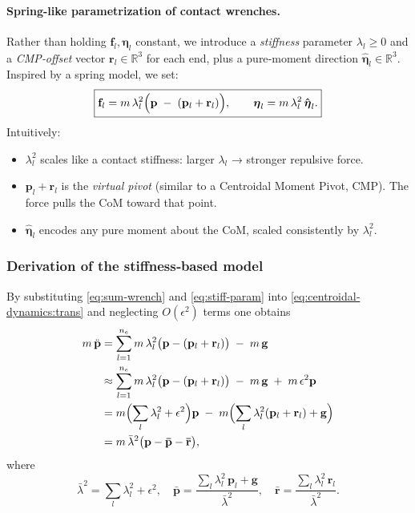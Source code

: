 \documentclass[main.tex]{subfiles}
\begin{document}
\begin{sloppypar}
\medskip
\paragraph{Spring-like parametrization of contact wrenches.}
Rather than holding $\mathbf{f}_l,\boldsymbol{\eta}_l$ constant, we introduce a \emph{stiffness} parameter $\lambda_l\ge0$ and a \emph{CMP‐offset} vector $\mathbf{r}_l\in\mathbb{R}^3$ for each end, plus a pure‐moment direction $\mathbf{\hat{\boldsymbol{\eta}}}_l\in\mathbb{R}^3$.  Inspired by a spring model, we set:
\begin{equation}\label{eq:stiff‐param}
\boxed{
\displaystyle
\mathbf{f}_l = m\,\lambda_l^2\Bigl(\mathbf{p} \;-\;(\mathbf{p}_l + \mathbf{r}_l)\Bigr),
\qquad
\boldsymbol{\eta}_l = m\,\lambda_l^2\,\mathbf{\hat{\boldsymbol{\eta}}}_l.
}
\end{equation}
Intuitively:
\begin{itemize}
  \item $\lambda_l^2$ scales like a contact stiffness: larger $\lambda_l$ → stronger repulsive force.
  \item $\mathbf{p}_l + \mathbf{r}_l$ is the \emph{virtual pivot} (similar to a Centroidal Moment Pivot, CMP).  The force pulls the CoM toward that point.
  \item $\mathbf{\hat{\boldsymbol{\eta}}}_l$ encodes any pure moment about the CoM, scaled consistently by $\lambda_l^2$.
\end{itemize}

\subsubsection*{Derivation of the stiffness‐based model}
By substituting \eqref{eq:sum‐wrench} and \eqref{eq:stiff‐param} into \eqref{eq:centroidal‐dynamics:trans} and neglecting $O(\epsilon^2)$ terms one obtains
\begin{align}
m\,\ddot{\mathbf{p}}
&= \sum_{l=1}^{n_e} m\,\lambda_l^2\bigl(\mathbf{p} - (\mathbf{p}_l + \mathbf{r}_l)\bigr) \;-\; m\,\mathbf{g}
\notag\\
&\approx \sum_{l=1}^{n_e} m\,\lambda_l^2\bigl(\mathbf{p} - (\mathbf{p}_l + \mathbf{r}_l)\bigr) \;-\; m\,\mathbf{g} \;+\; m\,\epsilon^2 \mathbf{p}
\notag\\
&= m\Bigl(\sum_{l}\lambda_l^2 + \epsilon^2\Bigr)\mathbf{p} \;-\; m\Bigl(\sum_{l}\lambda_l^2(\mathbf{p}_l + \mathbf{r}_l) + \mathbf{g}\Bigr)
\notag\\
&= m\,\bar\lambda^2\bigl(\mathbf{p} - \mathbf{\bar{p}} - \mathbf{\bar{r}}\bigr),
\label{eq:deriv‐trans}
\end{align}
where
\[
\bar\lambda^2 = \sum_{l}\lambda_l^2 + \epsilon^2,
\quad
\mathbf{\bar{p}} = \frac{\sum_{l}\lambda_l^2\,\mathbf{p}_l + \mathbf{g}}{\bar\lambda^2},
\quad
\mathbf{\bar{r}} = \frac{\sum_{l}\lambda_l^2\,\mathbf{r}_l}{\bar\lambda^2}.
\]


\end{sloppypar}
\end{document}
